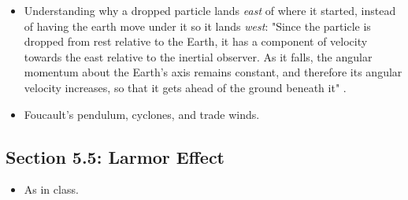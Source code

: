 \documentclass[../notes.tex]{subfiles}
\begin{document}
\begin{itemize}
\begin{figure}[H]
\begin{subfigure}[b]{0.3\linewidth}
            \caption{Rotating reference frame.}
            \label{fig:coriolisForceb}
        \end{subfigure}
        \caption{The Coriolis force in 2D.}
        \label{fig:coriolisForce}
    \end{figure}
    \begin{itemize}
        \item View the Earth from north pole so that it rotates counterclockwise beneath us with angular velocity $\omega$, as in Figure \ref{fig:coriolisForcea}. Alternatively, consider Figure \ref{fig:coriolisForcea} to represent a 2D disk rotating with angular velocity $\omega$.
        \item Let a particle travel across the disk.
        \begin{itemize}
            \item If we are in an inertial reference frame, it appears as if the particle takes a straight line (Figure \ref{fig:coriolisForcea}).
            \item If we are in a rotating reference frame, then it appears as if some force is curving the particle (Figure \ref{fig:coriolisForceb}).
        \end{itemize}
    \end{itemize}
    \item Understanding why a dropped particle lands \emph{east} of where it started, instead of having the earth move under it so it lands \emph{west}: "Since the particle is dropped from rest relative to the Earth, it has a component of velocity towards the east relative to the inertial observer. As it falls, the angular momentum about the Earth's axis remains constant, and therefore its angular velocity increases, so that it gets ahead of the ground beneath it" \parencite[116-17]{bib:KibbleBerkshire}.
    \item Foucault's pendulum, cyclones, and trade winds.
\end{itemize}


\subsection*{Section 5.5: Larmor Effect}
\begin{itemize}
    \item As in class.
\end{itemize}
\end{document}
